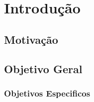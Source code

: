 \chapter{Introdução}
\lipsum

\section{Motivação}
\lipsum[1-4]

\section{Objetivo Geral}
\lipsum[1-4]

\subsection{Objetivos Especificos}
\lipsum[1-4]
